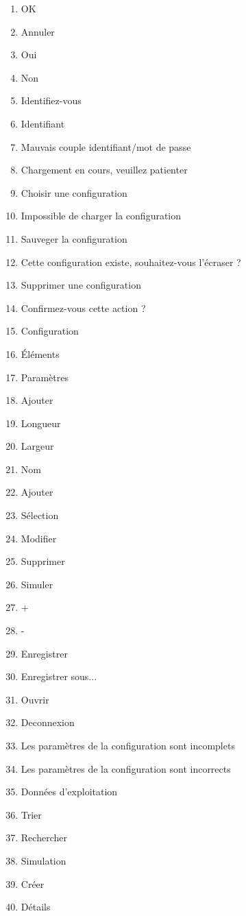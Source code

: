 
\begin{enumerate}
	\item OK
	\item Annuler
	\item Oui
	\item Non
	\item Identifiez-vous
	\item Identifiant
	\item Mauvais couple identifiant/mot de passe
	\item Chargement en cours, veuillez patienter
	\item Choisir une configuration
	\item Impossible de charger la configuration
	\item Sauveger la configuration
	\item Cette configuration existe, souhaitez-vous l'écraser ?
	\item Supprimer une configuration
	\item Confirmez-vous cette action ?
	\item Configuration
	\item Éléments
	\item Paramètres
	\item Ajouter
	\item Longueur
	\item Largeur
	\item Nom
	\item Ajouter
	\item Sélection
	\item Modifier
	\item Supprimer
	\item Simuler
	\item +
	\item -
	\item Enregistrer
	\item Enregistrer sous...
	\item Ouvrir
	\item Deconnexion
	\item Les paramètres de la configuration sont incomplets
	\item Les paramètres de la configuration sont incorrects
	\item Données d'exploitation
	\item Trier
	\item Rechercher
	\item Simulation
	\item Créer
	\item Détails

\end{enumerate}
